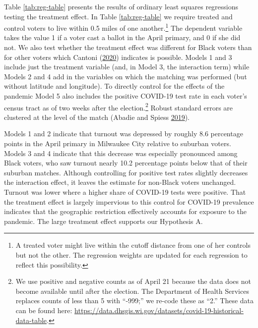 \documentclass[
  12pt,
]{article}
\begin{document}
Table \ref{tab:reg-table} presents the results of ordinary least squares regressions testing the treatment effect. In Table \ref{tab:reg-table} we require treated and control voters to live within 0.5 miles of one another.\footnote{A treated voter might live within the cutoff distance from one of her controls but not the other. The regression weights are updated for each regression to reflect this possibility.} The dependent variable takes the value 1 if a voter cast a ballot in the April primary, and 0 if she did not. We also test whether the treatment effect was different for Black voters than for other voters which Cantoni (\protect\hyperlink{ref-Cantoni2020}{2020}) indicates is possible. Models 1 and 3 include just the treatment variable (and, in Model 3, the interaction term) while Models 2 and 4 add in the variables on which the matching was performed (but without latitude and longitude). To directly control for the effects of the pandemic Model 5 also includes the positive COVID-19 test rate in each voter's census tract as of two weeks after the election.\footnote{We use positive and negative counts as of April 21 because the data does not become available until after the election. The Department of Health Services replaces counts of less than 5 with ``-999;'' we re-code these as ``2.'' These data can be found here: \url{https://data.dhsgis.wi.gov/datasets/covid-19-historical-data-table}.} Robust standard errors are clustered at the level of the match (Abadie and Spiess \protect\hyperlink{ref-Abadie2019}{2019}).

\begin{singlespace}


\end{singlespace}

Models 1 and 2 indicate that turnout was depressed by roughly 8.6 percentage points in the April primary in Milwaukee City relative to suburban voters. Models 3 and 4 indicate that this decrease was especially pronounced among Black voters, who saw turnout nearly 10.2 percentage points below that of their suburban matches. Although controlling for positive test rates slightly decreases the interaction effect, it leaves the estimate for non-Black voters unchanged. Turnout was lower where a higher share of COVID-19 tests were positive. That the treatment effect is largely impervious to this control for COVID-19 prevalence indicates that the geographic restriction effectively accounts for exposure to the pandemic. The large treatment effect supports our Hypothesis A.
\end{document}
